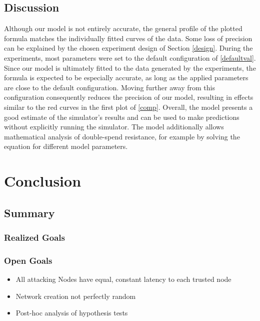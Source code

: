 \documentclass[a4paper,12pt,twoside]{report}
\begin{document}
\section{Discussion}
Although our model is not entirely accurate, the general profile of the plotted formula matches the individually fitted curves of the data. Some loss of precision can be explained by the chosen experiment design of Section \ref{design}. During the experiments, most parameters were set to the default configuration of \autoref{defaultval}. Since our model is ultimately fitted to the data generated by the experiments, the formula is expected to be especially accurate, as long as the applied parameters are close to the default configuration. Moving further away from this configuration consequently reduces the precision of our model, resulting in effects similar to the red curves in the first plot of \autoref{comp}. Overall, the model presents a good estimate of the simulator's results and can be used to make predictions without explicitly running the simulator. The model additionally allows mathematical analysis of double-spend resistance, for example by solving the equation for different model parameters.

\chapter{Conclusion}

\section{Summary}
\subsection{Realized Goals}

\subsection{Open Goals}
\begin{itemize}
\item All attacking Nodes have equal, constant latency to each trusted node
\item Network creation not perfectly random
\item Post-hoc analysis of hypothesis tests
\end{itemize}
\end{document}
